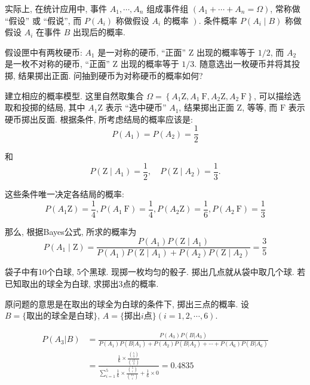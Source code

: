     实际上, 在统计应用中, 事件 $A_1, \cdots, A_n$ 组成事件组 $\left(A_1+\cdots+A_n=\Omega\right)$, 常称做 ``假设'' 或 ``假说'', 而 $P\left(A_i\right)$ 称做假设 $A_i$ 的概率 $\left.\right)$. 条件概率 $P\left(A_i \mid B\right)$ 称做假设 $A_i$ 在事件 $B$ 出现后的概率. 


\begin{exercise}
    假设匣中有两枚硬币: $A_1$ 是一对称的硬币, ``正面'' $\mathrm{Z}$ 出现的概率等于 $1 / 2$, 而 $A_2$ 是一枚不对称的硬币, ``正面'' $\mathrm{Z}$ 出现的概率等于 $1 / 3$. 随意选出一枚硬币并将其投掷, 结果掷出正面. 问抽到硬币为对称硬币的概率如何?
\end{exercise}

\begin{solution}
    建立相应的概率模型. 这里自然取集合 $\Omega=\left\{A_1 \mathrm{Z}, A_1 \mathrm{~F}, A_2 \mathrm{Z}, A_2 \mathrm{~F}\right\}$, 可以描绘选取和投掷的结局, 其中 $A_1 \mathrm{Z}$ 表示 ``选中硬币'' $A_1$, 结果掷出正面 $\mathrm{Z}$, 等等, 而 $\mathrm{F}$ 表示硬币掷出反面. 根据条件, 所考虑结局的概率应该是:
$$
P\left(A_1\right)=P\left(A_2\right)=\frac{1}{2}
$$

和
$$
P\left(\mathrm{Z} \mid A_1\right)=\frac{1}{2}, \quad P\left(\mathrm{Z} \mid A_2\right)=\frac{1}{3} .
$$

这些条件唯一决定各结局的概率:
$$
P\left(A_1 \mathrm{Z}\right)=\frac{1}{4}, P\left(A_1 \mathrm{~F}\right)=\frac{1}{4}, P\left(A_2 \mathrm{Z}\right)=\frac{1}{6}, P\left(A_2 \mathrm{~F}\right)=\frac{1}{3}
$$

那么, 根据Bayes公式, 所求的概率为
$$
P\left(A_1 \mid \mathrm{Z}\right)=\frac{P\left(A_1\right) P\left(\mathrm{Z} \mid A_1\right)}{P\left(A_1\right) P\left(\mathrm{Z} \mid A_1\right)+P\left(A_2\right) P\left(\mathrm{Z} \mid A_2\right)}=\frac{3}{5}
$$
\end{solution}

\begin{exercise}
    袋子中有10个白球, 5个黑球. 现掷一枚均匀的骰子. 掷出几点就从袋中取几个球. 若已知取出的球全为白球, 求掷出3点的概率. 
\end{exercise}

\begin{solution}
    原问题的意思是在取出的球全为白球的条件下, 掷出三点的概率. 设$B=\{\text{取出的球全是白球}\}$, $A=\{\text{掷出}i\text{点}\}(i=1,2,\cdots, 6)$.

    \begin{align*}
        P(A_3 | B) &= \frac{P(A_3)P(B|A_3)}{P(A_1)P(B|A_1)+P(A_2)P(B|A_2)+\cdots+P(A_6)P(B|A_6)} \\
        &= \frac{\frac16 \times \frac{\binom 53}{\binom {15}3}}{\sum_{i=1}^5 \frac16\times \frac{\binom 5i}{\binom{15}i}+\frac16\times 0}=0.4835
    \end{align*}
\end{solution}



